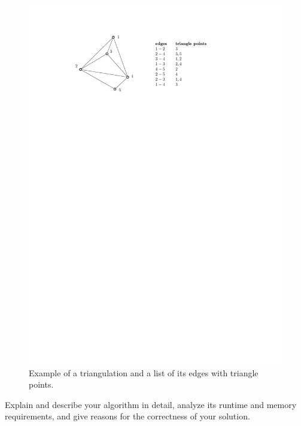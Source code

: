 \documentclass[english]{scrartcl}
\begin{document}
\begin{figure}[H]
    \centering
    \includegraphics{img/plain.pdf}
    \caption{Example of a triangulation and a list of its edges with triangle points.}
    \label{fig:fig1}
\end{figure}
Explain and describe your algorithm in detail, analyze its runtime and memory requirements, and give reasons for the correctness of your solution.
\newpage
\end{document}
